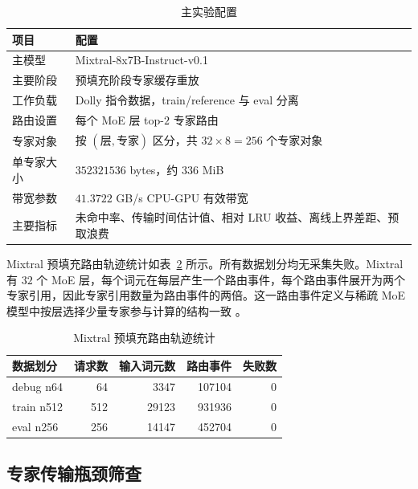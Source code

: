 \begin{table}[!htbp]
    \centering
    \caption{\label{tab:experiment-setup}主实验配置}
    \begin{tabularx}{\linewidth}{lX}
        \hline
        项目 & 配置 \\ \hline
        主模型 & Mixtral-8x7B-Instruct-v0.1 \\ \hline
        主要阶段 & 预填充阶段专家缓存重放 \\ \hline
        工作负载 & Dolly 指令数据，train/reference 与 eval 分离 \\ \hline
        路由设置 & 每个 MoE 层 top-$2$ 专家路由 \\ \hline
        专家对象 & 按 $(层, 专家)$ 区分，共 $32\times 8=256$ 个专家对象 \\ \hline
        单专家大小 & $352321536$ bytes，约 $336$ MiB \\ \hline
        带宽参数 & $41.3722$ GB/s CPU-GPU 有效带宽 \\ \hline
        主要指标 & 未命中率、传输时间估计值、相对 LRU 收益、离线上界差距、预取浪费 \\ \hline
    \end{tabularx}
\end{table}
\FloatBarrier

Mixtral 预填充路由轨迹统计如表~\ref{tab:trace-statistics} 所示。所有数据划分均无采集失败。Mixtral 有 $32$ 个 MoE 层，每个词元在每层产生一个路由事件，每个路由事件展开为两个专家引用，因此专家引用数量为路由事件的两倍。这一路由事件定义与稀疏 MoE 模型中按层选择少量专家参与计算的结构一致 \cite{shazeer2017outrageously,lepikhin2020gshard,jiang2024mixtral}。

\begin{table}[!htbp]
    \centering
    \caption{\label{tab:trace-statistics}Mixtral 预填充路由轨迹统计}
    \begin{tabularx}{\linewidth}{lrrrr}
        \hline
        数据划分 & 请求数 & 输入词元数 & 路由事件 & 失败数 \\ \hline
        debug n64 & 64 & 3347 & 107104 & 0 \\ \hline
        train n512 & 512 & 29123 & 931936 & 0 \\ \hline
        eval n256 & 256 & 14147 & 452704 & 0 \\ \hline
    \end{tabularx}
\end{table}
\FloatBarrier
\subsection{专家传输瓶颈筛查}

